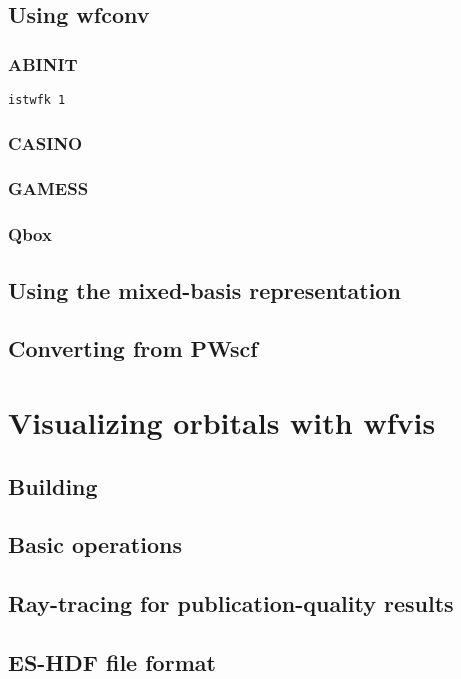 \subsection{Using wfconv}
\subsubsection{ABINIT}
\texttt{istwfk 1}
\subsubsection{CASINO}
\subsubsection{GAMESS}
\subsubsection{Qbox}
\subsection{Using the mixed-basis representation}

\subsection{Converting from PWscf}


\section{Visualizing orbitals with wfvis}
\subsection{Building}
\subsection{Basic operations}
\subsection{Ray-tracing for publication-quality results}

\subsection{ES-HDF file format}

